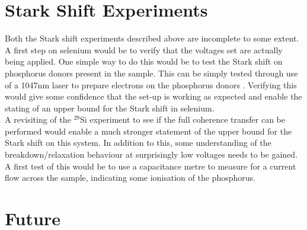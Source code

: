 \section{Stark Shift Experiments}

Both the Stark shift experiments described above are incomplete to some extent. 
A first step on selenium would be to verify that the voltages set are actually being applied.
One simple way to do this would be to test the Stark shift on phosphorus donors present in the sample.
This can be simply tested through use of a 1047nm laser to prepare electrons on the phosphorus donors \cite{Nardo2015}.
Verifying this would give some confidence that the set-up is working as expected and enable the stating of an upper bound for the Stark shift in selenium.
\\
A revisiting of the $^{29}$Si experiment to see if the full coherence transfer can be performed would enable a much stronger statement of the upper bound for the Stark shift on this system.
In addition to this, some understanding of the breakdown/relaxation behaviour at surprisingly low voltages needs to be gained.
A first test of this would be to use a capacitance metre to measure for a current flow across the sample, indicating some ionisation of the phosphorus. 

\section{Future}

